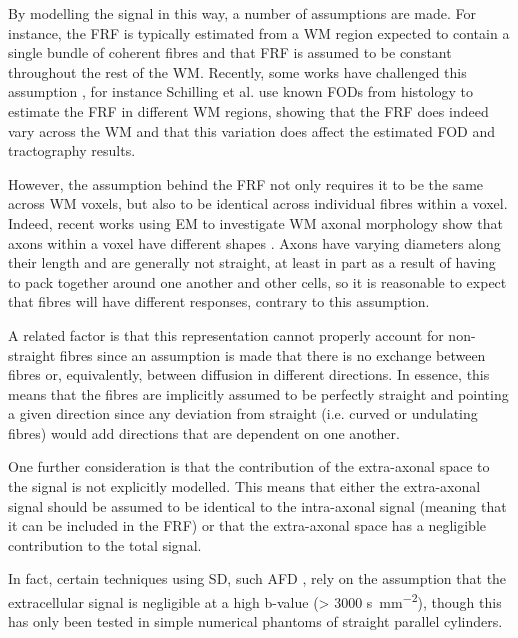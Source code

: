 By modelling the signal in this way, a number of assumptions are made. For instance, the \ac{FRF} is typically estimated from a \ac{WM} region expected to contain a single bundle of coherent fibres and that \ac{FRF} is assumed to be constant throughout the rest of the \ac{WM}.
Recently, some works have challenged this assumption \cite{Novikov2019,Schilling2019,Christiaens2020}, for instance Schilling et al. \cite{Schilling2019} use known \acs{FOD}s from histology to estimate the \ac{FRF} in different WM regions, showing that the \ac{FRF} does indeed vary across the \ac{WM} and that this variation does affect the estimated \ac{FOD} and tractography results.

However, the assumption behind the \ac{FRF} not only requires it to be the same across WM voxels, but also to be identical across individual fibres within a voxel.
Indeed, recent works using \ac{EM} to investigate \ac{WM} axonal morphology show that axons within a voxel have different shapes \cite{Lee2019b,Abdollahzadeh2019}. Axons have varying diameters along their length and are generally not straight, at least in part as a result of having to pack together around one another and other cells, so it is reasonable to expect that fibres will have different responses, contrary to this assumption.

A related factor is that this representation cannot properly account for non-straight fibres since an assumption is made that there is no exchange between fibres or, equivalently, between diffusion in different directions. In essence, this means that the fibres are implicitly assumed to be perfectly straight and pointing a given direction since any deviation from straight (i.e. curved or undulating fibres) would add directions that are dependent on one another.

One further consideration is that the contribution of the extra-axonal space to the signal is not explicitly modelled. This means that either the extra-axonal signal should be assumed to be identical to the intra-axonal signal (meaning that it can be included in the \ac{FRF}) or that the extra-axonal space has a negligible contribution to the total signal.

In fact, certain techniques using \ac{SD}, such \ac{AFD} \cite{Raffelt2012}, rely on the assumption that the extracellular signal is negligible at a high b-value (> 3000 \si{\second\per\milli\metre\squared}), though this has only been tested in simple numerical phantoms of straight parallel cylinders.

